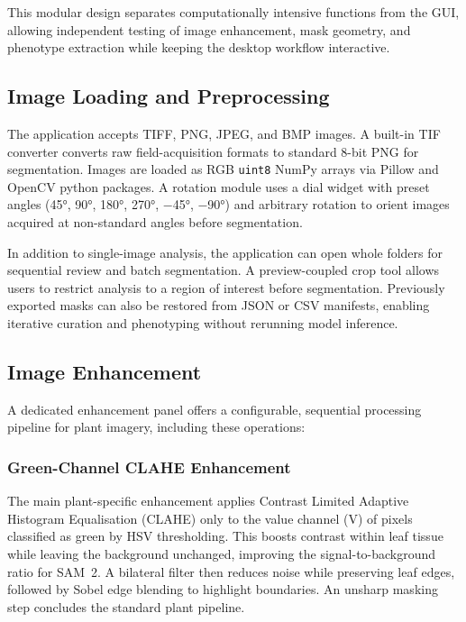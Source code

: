\documentclass[12pt, a4paper]{article}
\begin{document}
This modular design separates computationally intensive functions from the GUI, allowing independent testing of image enhancement, mask geometry, and phenotype extraction while keeping the desktop workflow interactive.


\subsection{Image Loading and Preprocessing}

The application accepts TIFF, PNG, JPEG, and BMP images. A built-in TIF converter converts raw field-acquisition formats to standard 8-bit PNG for segmentation. Images are loaded as RGB \texttt{uint8} NumPy arrays via Pillow and OpenCV python packages. A rotation module uses a dial widget with preset angles (45°, 90°, 180°, 270°, $-$45°, $-$90°) and arbitrary rotation to orient images acquired at non-standard angles before segmentation.

In addition to single-image analysis, the application can open whole folders for sequential review and batch segmentation. A preview-coupled crop tool allows users to restrict analysis to a region of interest before segmentation. Previously exported masks can also be restored from JSON or CSV manifests, enabling iterative curation and phenotyping without rerunning model inference.

\subsection{Image Enhancement}

A dedicated enhancement panel offers a configurable, sequential processing pipeline for plant imagery, including these operations:

\subsubsection{Green-Channel CLAHE Enhancement}

The main plant-specific enhancement applies Contrast Limited Adaptive Histogram Equalisation (CLAHE) \citep{zuiderveld1994clahe} only to the value channel (V) of pixels classified as green by HSV thresholding. This boosts contrast within leaf tissue while leaving the background unchanged, improving the signal-to-background ratio for SAM~2. A bilateral filter \citep{tomasi1998bilateral} then reduces noise while preserving leaf edges, followed by Sobel edge blending \citep{sobel1968isotropic} to highlight boundaries. An unsharp masking step \citep{dahl2008contrast} concludes the standard plant pipeline.
\end{document}
